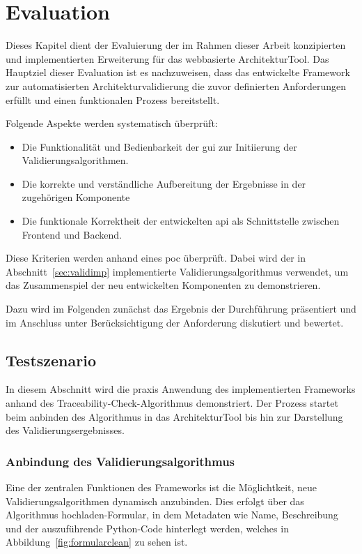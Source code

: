 
\chapter{Evaluation}
\label{ch:evaluation}

Dieses Kapitel dient der Evaluierung der im Rahmen dieser Arbeit konzipierten und implementierten Erweiterung für das webbasierte ArchitekturTool. Das Hauptziel dieser Evaluation ist es nachzuweisen, dass das entwickelte Framework zur automatisierten Architekturvalidierung die zuvor definierten Anforderungen erfüllt und einen funktionalen Prozess bereitstellt.

Folgende Aspekte werden systematisch überprüft:
\begin{itemize}
  \item Die Funktionalität und Bedienbarkeit der \gls{gui} zur Initiierung der Validierungsalgorithmen.
  \item Die korrekte und verständliche Aufbereitung der Ergebnisse in der zugehörigen Komponente
  \item Die funktionale Korrektheit der entwickelten \gls{api} als Schnittstelle zwischen Frontend und Backend.
\end{itemize}

Diese Kriterien werden anhand eines \gls{poc} überprüft. Dabei wird der in Abschnitt~\ref{sec:validimp} implementierte Validierungsalgorithmus verwendet, um das Zusammenspiel der neu entwickelten Komponenten zu demonstrieren.

Dazu wird im Folgenden zunächst   das Ergebnis der Durchführung präsentiert und im Anschluss unter Berücksichtigung der Anforderung diskutiert und bewertet.

\section{Testszenario}
\label{sec:testszenario}

In diesem Abschnitt wird die praxis Anwendung des implementierten Frameworks anhand des Traceability-Check-Algorithmus demonstriert. Der Prozess startet beim anbinden des Algorithmus in das ArchitekturTool bis hin zur Darstellung des Validierungsergebnisses.

\subsection{Anbindung des Validierungsalgorithmus}
Eine der zentralen Funktionen des Frameworks ist die Möglichtkeit, neue Validierungsalgorithmen dynamisch anzubinden. Dies erfolgt über das \glqq Algorithmus hochladen\grqq{}-Formular, in dem Metadaten wie Name, Beschreibung und der auszuführende Python-Code hinterlegt werden, welches in Abbildung~\ref{fig:formularclean} zu sehen ist.

